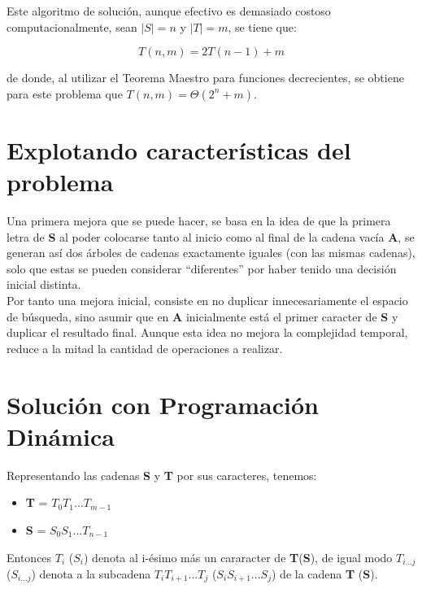 \documentclass[a4paper]{article}
\begin{document}
    Este algoritmo de soluci\'on, aunque efectivo es demasiado costoso computacionalmente, sean $|S| = n$ y $|T| = m$, se tiene que:

    \begin{equation*}
        T(n,m) = 2 T(n-1) + m 
    \end{equation*}

    de donde, al utilizar el Teorema Maestro para funciones decrecientes, se obtiene para este problema que 
     $T(n,m) = \Theta(2^n + m)$.

    \section*{Explotando caracter\'isticas del problema}
    Una primera mejora que se puede hacer, se basa en la idea de que la primera letra de \textbf{S} 
    al poder colocarse tanto al inicio como al final de la cadena vac\'ia \textbf{A}, se generan así dos \'arboles de cadenas exactamente iguales (con las mismas cadenas), solo que estas se pueden considerar ``diferentes'' por 
    haber tenido una decisi\'on inicial distinta.\\ 

    Por tanto una mejora inicial, consiste en no duplicar innecesariamente el espacio de b\'usqueda, sino asumir que en \textbf{A} inicialmente 
    est\'a el primer caracter de \textbf{S} y duplicar el resultado final. Aunque esta idea no mejora la complejidad temporal, reduce a la mitad la cantidad de operaciones a realizar.

    \section*{Soluci\'on con Programaci\'on Din\'amica}

    Representando las cadenas \textbf{S} y \textbf{T} por sus caracteres, tenemos:

    \begin{itemize}
        \item[] \textbf{T} = $T_0T_1 ... T_{m-1}$
        \item[] \textbf{S} = $S_0S_1 ... T_{n-1}$ 
    \end{itemize}

    Entonces $T_i$ ($S_i$) denota al i-\'esimo m\'as un cararacter de \textbf{T}(\textbf{S}), de igual modo 
    $T_{i...j}$($S_{i...j}$) denota a la subcadena $T_iT_{i+1}...T_j$ ($S_iS_{i+1}...S_{j}$) de la cadena \textbf{T} (\textbf{S}).\\
    
\end{document}
